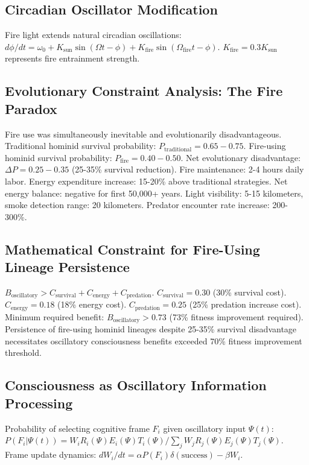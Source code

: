 \documentclass[12pt,a4paper]{article}
\begin{document}
\subsection{Circadian Oscillator Modification}

Fire light extends natural circadian oscillations: $d\phi/dt = \omega_0 + K_{\text{sun}} \sin(\Omega t - \phi) + K_{\text{fire}} \sin(\Omega_{\text{fire}} t - \phi)$. $K_{\text{fire}} = 0.3 K_{\text{sun}}$ represents fire entrainment strength.

\subsection{Evolutionary Constraint Analysis: The Fire Paradox}

Fire use was simultaneously inevitable and evolutionarily disadvantageous. Traditional hominid survival probability: $P_{\text{traditional}} = 0.65-0.75$. Fire-using hominid survival probability: $P_{\text{fire}} = 0.40-0.50$. Net evolutionary disadvantage: $\Delta P = 0.25-0.35$ (25-35\% survival reduction). Fire maintenance: 2-4 hours daily labor. Energy expenditure increase: 15-20\% above traditional strategies. Net energy balance: negative for first 50,000+ years. Light visibility: 5-15 kilometers, smoke detection range: 20 kilometers. Predator encounter rate increase: 200-300\%.

\subsection{Mathematical Constraint for Fire-Using Lineage Persistence}

$B_{\text{oscillatory}} > C_{\text{survival}} + C_{\text{energy}} + C_{\text{predation}}$. $C_{\text{survival}} = 0.30$ (30\% survival cost). $C_{\text{energy}} = 0.18$ (18\% energy cost). $C_{\text{predation}} = 0.25$ (25\% predation increase cost). Minimum required benefit: $B_{\text{oscillatory}} > 0.73$ (73\% fitness improvement required). Persistence of fire-using hominid lineages despite 25-35\% survival disadvantage necessitates oscillatory consciousness benefits exceeded 70\% fitness improvement threshold.

\subsection{Consciousness as Oscillatory Information Processing}

Probability of selecting cognitive frame $F_i$ given oscillatory input $\Psi(t)$: $P(F_i | \Psi(t)) = W_i R_i(\Psi) E_i(\Psi) T_i(\Psi) / \sum_j W_j R_j(\Psi) E_j(\Psi) T_j(\Psi)$. Frame update dynamics: $dW_i/dt = \alpha P(F_i) \delta(\text{success}) - \beta W_i$.
\end{document}
